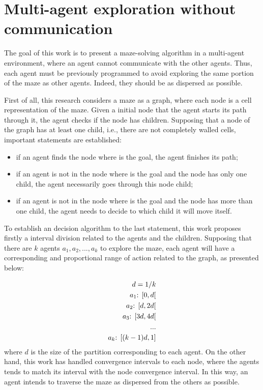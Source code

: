 \section{Multi-agent exploration without communication}
\label{section_models_exploration}
The goal of this work is to present a maze-solving algorithm in a multi-agent environment, where an agent cannot communicate with the other agents. Thus, each agent must be previously programmed to avoid exploring the same portion of the maze as other agents. Indeed, they should be as dispersed as possible.

First of all, this research considers a maze as a graph, where each node is a cell representation of the maze. Given a initial node that the agent starts its path through it, the agent checks if the node has children. Supposing that a node of the graph has at least one child, i.e., there are not completely walled cells, important statements are established:

\begin{itemize}
\item if an agent finds the node where is the goal, the agent finishes its path;

\item if an agent is not in the node where is the goal and the node has only one child, the agent necessarily goes through this node child;

\item if an agent is not in the node where is the goal and the node has more than one child, the agent needs to decide to which child it will move itself.
\end{itemize}

To establish an decision algorithm to the last statement, this work proposes firstly a interval division related to the agents and the children. Supposing that there are $k$ agents $a_{1}, a_{2},...,a_{k}$ to explore the maze, each agent will have a corresponding and proportional range of action related to the graph, as presented below:

\begin{equation}
	\begin{align}
			d = 1/k\\
		a_{1} \textnormal{: } [0, d[\\
		a_{2} \textnormal{: } [d, 2d[\\
		a_{3} \textnormal{: } [3d, 4d[\\
		...\\
		a_{k} \textnormal{: } [(k-1)d, 1]
	\end{align}
\end{equation}
where $d$ is the size of the partition corresponding to each agent. On the other hand, this work has handled convergence intervals to each node, where the agents tends to match its interval with the node convergence interval. In this way, an agent intends to traverse the maze as dispersed from the others as possible.

